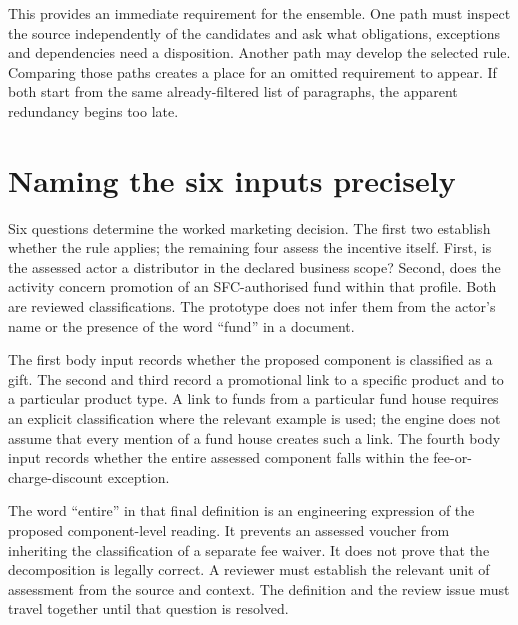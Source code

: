 This provides an immediate requirement for the ensemble. One path must inspect
the source independently of the candidates and ask what obligations, exceptions
and dependencies need a disposition. Another path may develop the selected
rule. Comparing those paths creates a place for an omitted requirement to
appear. If both start from the same already-filtered list of paragraphs, the
apparent redundancy begins too late.

\section{Naming the six inputs precisely}
\label{merge:M02:02}

\label{sec:circular-inputs}
Six questions determine the worked marketing decision. The first two establish
whether the rule applies; the remaining four assess the incentive itself. First,
is the assessed actor a distributor in the declared business scope? Second, does
the activity concern promotion
of an SFC-authorised fund within that profile. Both are reviewed classifications.
The prototype does not infer them from the actor's name or the presence of the
word ``fund'' in a document.

The first body input records whether the proposed component is classified as a
gift. The second and third record a promotional link to a specific product and
to a particular product type. A link to funds from a particular fund house
requires an explicit classification where the relevant example is used; the
engine does not assume that every mention of a fund house creates such a link.
The fourth body input records whether the entire assessed component falls
within the fee-or-charge-discount exception.

The word ``entire'' in that final definition is an engineering expression of
the proposed component-level reading. It prevents an assessed voucher from
inheriting the classification of a separate fee waiver. It does not prove that
the decomposition is legally correct. A reviewer must establish the relevant
unit of assessment from the source and context. The definition and the review
issue must travel together until that question is resolved.

